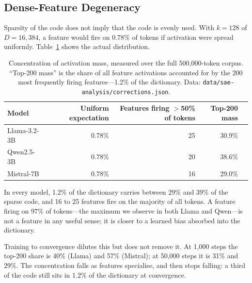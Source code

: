 \documentclass[11pt]{article}
\begin{document}
\subsection{Dense-Feature Degeneracy}
\label{sec:dense}

Sparsity of the code does not imply that the code is evenly used. With $k = 128$ of
$D = 16{,}384$, a feature would fire on 0.78\% of tokens if activation were spread
uniformly. Table~\ref{tab:dense} shows the actual distribution.

\begin{table}[t]
  \centering
  \caption{Concentration of activation mass, measured over the full 500{,}000-token
    corpus. ``Top-200 mass'' is the share of all feature activations accounted for by
    the 200 most frequently firing features---1.2\% of the dictionary.
    Data: \texttt{data/sae-analysis/corrections.json}.}
  \label{tab:dense}
  \smallskip
  \begin{tabular}{lrrrr}
    \toprule
    Model & Uniform expectation & Features firing $>$50\% of tokens & Top-200 mass \\
    \midrule
    Llama-3.2-3B & 0.78\% & 25 & 30.9\% \\
    Qwen2.5-3B   & 0.78\% & 20 & 38.6\% \\
    Mistral-7B   & 0.78\% & 16 & 29.0\% \\
    \bottomrule
  \end{tabular}
\end{table}

In every model, 1.2\% of the dictionary carries between 29\% and 39\% of the sparse
code, and 16 to 25 features fire on the majority of all tokens. A feature firing on
97\% of tokens---the maximum we observe in both Llama and Qwen---is not a feature in any
useful sense; it is closer to a learned bias absorbed into the dictionary.

Training to convergence dilutes this but does not remove it. At 1{,}000 steps the
top-200 share is 40\% (Llama) and 57\% (Mistral); at 50{,}000 steps it is 31\% and 29\%. The concentration falls as features
specialise, and then stops falling: a third of the code still sits in 1.2\% of the
dictionary at convergence.
\end{document}
